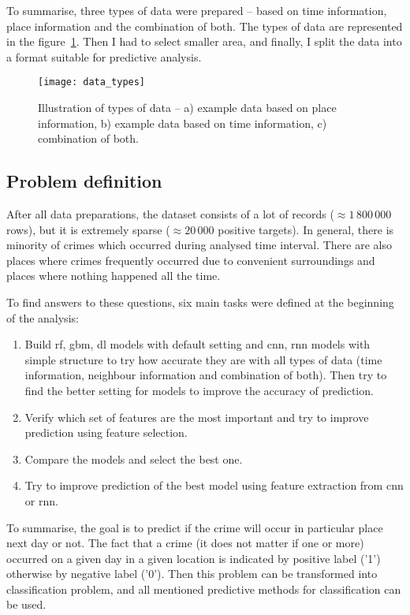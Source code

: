 \documentclass[thesis=M,english]{FITthesis}[2012/10/20]
\begin{document}
To summarise, three types of data were prepared -- based on time information, place information and the combination of both. The types of data are represented in the figure~\ref{fig:data_types}. Then I had to select smaller area, and finally, I split the data into a format suitable for predictive analysis. 

\begin{figure}[ht]\centering
    \texttt{[image: data\_types]}\label{fig:data_types}
    \caption{Illustration of types of data -- a) example data based on place information, b) example data based on time information, c) combination of both.}
\end{figure}

\subsection{Problem definition}\label{sec:problem_definition}

After all data preparations, the dataset consists of a lot of records ($\approx1\,800\,000$ rows), but it is extremely sparse ($\approx20\,000$ positive targets). In general, there is minority of crimes which occurred during analysed time interval. There are also places where crimes frequently occurred due to convenient surroundings and places where nothing happened all the time.

To find answers to these questions, six main tasks were defined at the beginning of the analysis:

\begin{enumerate}
    \item Build \gls{rf}, \gls{gbm}, \gls{dl} models with default setting and \gls{cnn}, \gls{rnn} models with simple structure to try how accurate they are with all types of data (time information, neighbour information and combination of both). Then try to find the better setting for models to improve the accuracy of prediction.
    \item Verify which set of features are the most important and try to improve prediction using feature selection.
    \item Compare the models and select the best one.
    \item Try to improve prediction of the best model using feature extraction from \gls{cnn} or \gls{rnn}.
\end{enumerate}

To summarise, the goal is to predict if the crime will occur in particular place next day or not. The fact that a crime (it does not matter if one or more) occurred on a given day in a given location is indicated by positive label ('1') otherwise by negative label ('0'). Then this problem can be transformed into classification problem, and all mentioned predictive methods for classification can be used.
\end{document}
